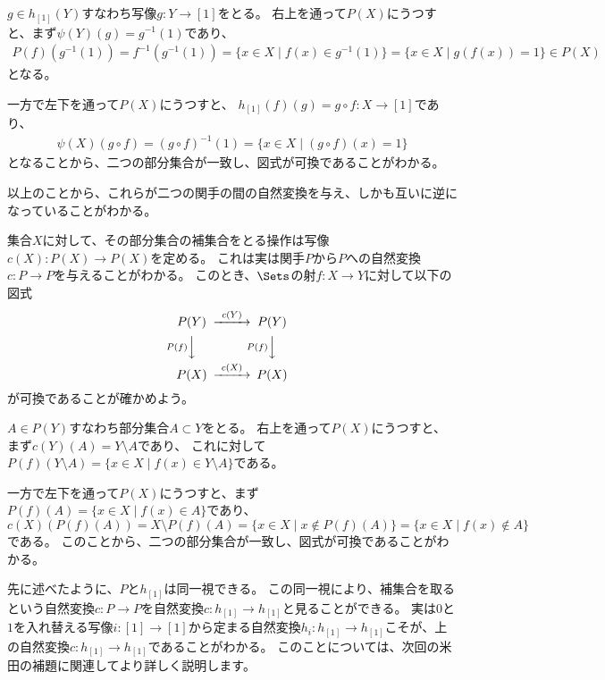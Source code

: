 \documentclass{jsarticle}
\begin{document}
$g \in h_{[1]}(Y)$すなわち写像$g:Y \to [1]$をとる。
右上を通って$P(X)$にうつすと、まず$\psi(Y)(g)=g^{-1}(1)$であり、
\begin{align*}
P(f)(g^{-1}(1))=f^{-1}(g^{-1}(1))=\{x \in X \mid f(x) \in g^{-1}(1)\}=\{x \in X \mid g(f(x))=1\} \in P(X)
\end{align*}
となる。

一方で左下を通って$P(X)$にうつすと、
$h_{[1]}(f)(g)=g\circ f:X \to [1]$であり、
\begin{align*}
\psi(X)(g\circ f)=(g\circ f)^{-1}(1)=\{x \in X \mid (g\circ f)(x) = 1\}
\end{align*}
となることから、二つの部分集合が一致し、図式が可換であることがわかる。

\vspace{5pt}

以上のことから、これらが二つの関手の間の自然変換を与え、しかも互いに逆になっていることがわかる。

\vspace{10pt}
集合$X$に対して、その部分集合の補集合をとる操作は写像$c(X):P(X)\to P(X)$を定める。
これは実は関手$P$から$P$への自然変換$c:P \to P$を与えることがわかる。
このとき、$\Sets$の射$f:X \to Y$に対して以下の図式
\begin{align*}
\begin{CD}
P(Y)@>c(Y)>>P(Y)\\
@VP(f)VV@VP(f)VV\\
P(X)@>c(X)>>P(X)
\end{CD}
\end{align*}
が可換であることが確かめよう。

$A \in P(Y)$すなわち部分集合$A\subset Y$をとる。
右上を通って$P(X)$にうつすと、まず$c(Y)(A)=Y \setminus A$であり、
これに対して$P(f)(Y\setminus A)=\{x \in X \mid f(x) \in Y \setminus A\}$である。

一方で左下を通って$P(X)$にうつすと、まず$P(f)(A)=\{x \in X \mid f(x) \in A\}$であり、
$c(X)(P(f)(A))=X \setminus P(f)(A)=\{x \in X \mid x \notin P(f)(A)\}=\{x \in X \mid f(x) \notin A\} $である。
このことから、二つの部分集合が一致し、図式が可換であることがわかる。

\vspace{10pt}
先に述べたように、$P$と$h_{[1]}$は同一視できる。
この同一視により、補集合を取るという自然変換$c:P \to P$を自然変換$c:h_{[1]} \to h_{[1]}$と見ることができる。
実は$0$と$1$を入れ替える写像$i:[1] \to [1]$から定まる自然変換$h_i:h_{[1]} \to h_{[1]}$こそが、上の自然変換$c:h_{[1]} \to h_{[1]}$であることがわかる。
このことについては、次回の米田の補題に関連してより詳しく説明します。
\end{document}
